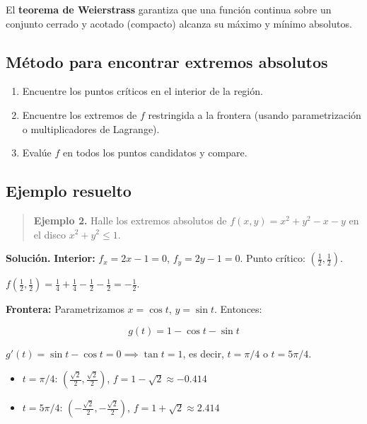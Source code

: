 \documentclass[
]{book}
\providecommand{\tightlist}{%
  \setlength{\itemsep}{0pt}\setlength{\parskip}{0pt}}
\begin{document}
El \textbf{teorema de Weierstrass} garantiza que una función continua sobre un conjunto cerrado y acotado (compacto) alcanza su máximo y mínimo absolutos.

\subsection{Método para encontrar extremos absolutos}\label{muxe9todo-para-encontrar-extremos-absolutos}

\begin{enumerate}
\def\labelenumi{\arabic{enumi}.}
\tightlist
\item
  Encuentre los puntos críticos en el interior de la región.
\item
  Encuentre los extremos de \(f\) restringida a la frontera (usando parametrización o multiplicadores de Lagrange).
\item
  Evalúe \(f\) en todos los puntos candidatos y compare.
\end{enumerate}

\subsection{Ejemplo resuelto}\label{ejemplo-resuelto-14}

\begin{quote}
\textbf{Ejemplo 2.} Halle los extremos absolutos de \(f(x, y) = x^2 + y^2 - x - y\) en el disco \(x^2 + y^2 \leq 1\).
\end{quote}

\textbf{Solución.} \textbf{Interior:} \(f_x = 2x - 1 = 0\), \(f_y = 2y - 1 = 0\). Punto crítico: \((\frac{1}{2}, \frac{1}{2})\).

\(f(\frac{1}{2}, \frac{1}{2}) = \frac{1}{4} + \frac{1}{4} - \frac{1}{2} - \frac{1}{2} = -\frac{1}{2}\).

\textbf{Frontera:} Parametrizamos \(x = \cos t\), \(y = \sin t\). Entonces:

\[
g(t) = 1 - \cos t - \sin t
\]

\(g'(t) = \sin t - \cos t = 0 \implies \tan t = 1\), es decir, \(t = \pi/4\) o \(t = 5\pi/4\).

\begin{itemize}
\tightlist
\item
  \(t = \pi/4\): \((\frac{\sqrt{2}}{2}, \frac{\sqrt{2}}{2})\), \(f = 1 - \sqrt{2} \approx -0.414\)
\item
  \(t = 5\pi/4\): \((-\frac{\sqrt{2}}{2}, -\frac{\sqrt{2}}{2})\), \(f = 1 + \sqrt{2} \approx 2.414\)
\end{itemize}
\end{document}
